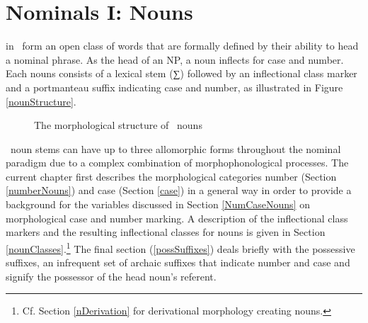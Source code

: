 


\chapter{Nominals I: Nouns}\label{nouns}
 in \PS\ form an open class of words that are formally defined %
by their ability to head a nominal phrase. As the head of an NP, a noun inflects for case and number. 
Each nouns consists of a lexical stem (∑) followed by an inflectional class marker and a portmanteau suffix indicating case and number, as illustrated in Figure \vref{nounStructure}.
\begin{figure}\centering
{}
\caption{The morphological structure of \PS\ nouns}\label{nounStructure}
\end{figure}

\PS\ noun stems can have up to three allomorphic forms throughout the nominal paradigm due to a complex combination of morphophonological processes. 
The current chapter first describes the morphological categories number (Section \ref{numberNouns}) and case (Section \ref{case}) in a general way in order to provide a background for the variables discussed in Section \ref{NumCaseNouns} on morphological case and number marking. %
A description of the inflectional class markers and the resulting inflectional classes for nouns is given in Section \ref{nounClasses}.\footnote{Cf. Section \ref{nDerivation} for derivational morphology creating nouns.} %
The final section (\ref{possSuffixes}) deals briefly with the possessive suffixes, an infrequent set of archaic suffixes that indicate number and case and signify the possessor of the head noun’s referent. %

